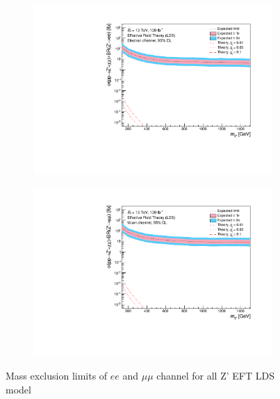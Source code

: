 \documentclass[12pt, a4paper]{book}
\begin{document}
\begin{figure}[!ht]
	\centering
   \begin{subfigure}[b]{0.49\textwidth}
      \centering
      \includegraphics[width=1\textwidth]{Limits/EFT_LDS/mass_exclusion_ee.pdf}
      \end{subfigure}
   \hfill
   \begin{subfigure}[b]{0.49\textwidth}
      \centering
      \includegraphics[width=1\textwidth]{Limits/EFT_LDS/mass_exclusion_uu.pdf}
      \end{subfigure}
   \caption{Mass exclusion limits of $ee$ and $\mu\mu$ channel for all Z' EFT LDS model}\label{fig:EFT_LDS_exclusion_ee_uu}
\end{figure}
\clearpage
\end{document}
